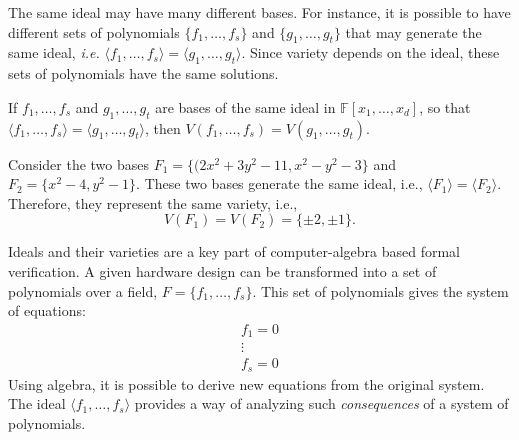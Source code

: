 The same ideal may have many different bases.
For instance, it is possible to have different sets of polynomials
$\{f_1,\dots,f_{s}\}$ and $\{g_{1},\dots,g_{t}\}$ that may generate the same 
ideal, {\it i.e.} 
$\langle f_{1},\dots,f_{s}\rangle=\langle g_{1},\dots,g_{t}\rangle$. Since 
variety depends on the ideal, these sets of polynomials have the same 
solutions.

\begin{Proposition}
If $f_1,\dots,f_{s}$ and $g_{1},\dots,g_{t}$ are bases of the same ideal 
in $\mathbb{F}[x_{1},\dots,x_{d}]$,
so that $\langle f_{1},\dots,f_{s}\rangle=\langle g_{1},\dots,g_{t}\rangle$, 
then $V(f_{1},\dots,f_{s})=V(g_{1},\dots,g_{t})$.
\end{Proposition}

\begin{Example}
	Consider the two bases $F_{1}=\{(2x^{2}+3y^{2}-11,x^{2}-y^{2}-3\}$ and $F_{2}=\{x^{2}-4,y^{2}-1\}$.
	These two bases generate the same ideal, i.e., $\langle F_{1}\rangle= \langle F_{2} \rangle$.{}
	Therefore, they represent the same variety, i.e., 
	\begin{equation}
		V(F_{1})= V( F_{2})=\{\pm 2, \pm 1\}.
	\end{equation}
\end{Example}

Ideals and their varieties are a key part of computer-algebra based formal
verification. A given hardware design can be transformed into a set
of polynomials over a field, $F = \{f_1, \ldots, f_s\}$.
This set of polynomials gives the system of equations:
\begin{eqnarray}
f_1 = 0 \nonumber \\
\vdots \nonumber \\
f_s = 0 \nonumber
\end{eqnarray}
Using algebra, it is possible to derive new equations from the original 
system.
The ideal $\langle f_1,\ldots, f_s \rangle$ provides a way of analyzing 
such {\it consequences} of a system of polynomials.

